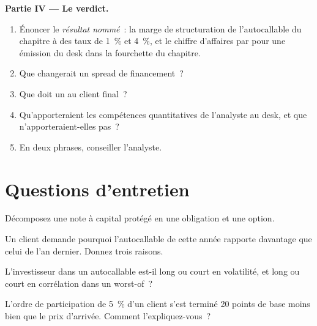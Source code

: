 \begin{problem}
\medskip\noindent\textbf{Partie IV --- Le verdict.}
\begin{enumerate}[resume]
\item Énoncer le \emph{résultat nommé}~: la marge de structuration de l'autocallable du chapitre à des taux de 1~\% et 4~\%, et le
chiffre d'affaires par  pour une émission du desk dans la fourchette du chapitre.
\item Que changerait un spread de financement~?
\item Que doit un  au client final~?
\item Qu'apporteraient les compétences quantitatives de l'analyste au desk, et que n'apporteraient-elles pas~?
\item En deux phrases, conseiller l'analyste.
\end{enumerate}
\end{problem}

\section{Questions d'entretien}

\begin{interviewq}\label{iq:in:structurer-sales-and-sales-trader:1}
Décomposez une note à capital protégé en une obligation et une option.
\end{interviewq}

\begin{interviewq}\label{iq:in:structurer-sales-and-sales-trader:2}
Un client demande pourquoi l'autocallable de cette année rapporte davantage que celui de l'an dernier. Donnez trois raisons.
\end{interviewq}

\begin{interviewq}\label{iq:in:structurer-sales-and-sales-trader:3}
L'investisseur dans un autocallable est-il long ou court en volatilité, et long ou court en corrélation dans un worst-of~?
\end{interviewq}

\begin{interviewq}\label{iq:in:structurer-sales-and-sales-trader:4}
L'ordre de participation de 5~\% d'un client s'est terminé 20 points de base moins bien que le prix d'arrivée. Comment l'expliquez-vous~?
\end{interviewq}


